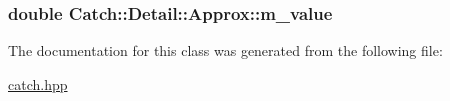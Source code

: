 \hypertarget{class_catch_1_1_detail_1_1_approx_af7aeef703bd591f5ec85407b1dac053c}{
\subsubsection[{m\-\_\-value}]{\setlength{\rightskip}{0pt plus 5cm}double Catch\-::\-Detail\-::\-Approx\-::m\-\_\-value\hspace{0.3cm}{\ttfamily [private]}}}\label{class_catch_1_1_detail_1_1_approx_af7aeef703bd591f5ec85407b1dac053c}


The documentation for this class was generated from the following file\-:\begin{DoxyCompactItemize}
\item 
\hyperlink{catch_8hpp}{catch.\-hpp}\end{DoxyCompactItemize}
